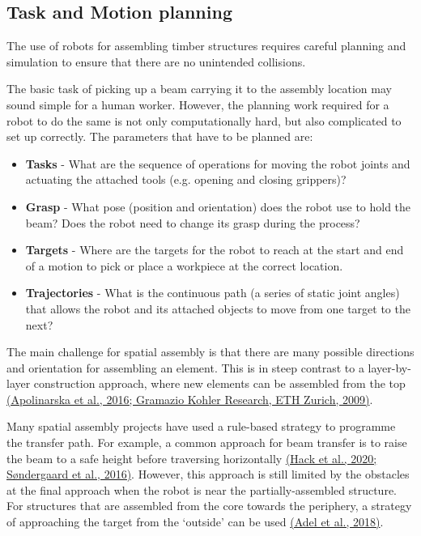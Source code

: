 \documentclass[11pt]{book}
\begin{document}
\subsection{Task and Motion planning}

The use of robots for assembling timber structures requires careful planning and simulation to ensure that there are no unintended collisions. 

The basic task of picking up a beam carrying it to the assembly location may sound simple for a human worker. However, the planning work required for a robot to do the same is not only computationally hard, but also complicated to set up correctly. The parameters that have to be planned are:

\begin{itemize}
	\item \textbf{Tasks} - What are the sequence of operations for moving the robot joints and actuating the attached tools (e.g. opening and closing grippers)?

	\item \textbf{Grasp }- What pose (position and orientation) does the robot use to hold the beam? Does the robot need to change its grasp during the process?

	\item \textbf{Targets }- Where are the targets for the robot to reach at the start and end of a motion to pick or place a workpiece at the correct location.

	\item \textbf{Trajectories }- What is the continuous path (a series of static joint angles) that allows the robot and its attached objects to move from one target to the next?

\end{itemize}
The main challenge for spatial assembly is that there are many possible directions and orientation for assembling an element. This is in steep contrast to a layer-by-layer construction approach, where new elements can be assembled from the top \href{https://www.zotero.org/google-docs/?vZK1dq}{(Apolinarska et al., 2016; Gramazio Kohler Research, ETH Zurich, 2009)}. 

Many spatial assembly projects have used a rule-based strategy to programme the transfer path. For example, a common approach for beam transfer is to raise the beam to a safe height before traversing horizontally \href{https://www.zotero.org/google-docs/?SFqNJ2}{(Hack et al., 2020; Søndergaard et al., 2016)}. However, this approach is still limited by the obstacles at the final approach when the robot is near the partially-assembled structure. For structures that are assembled from the core towards the periphery, a strategy of approaching the target from the ‘outside’ can be used \href{https://www.zotero.org/google-docs/?aftLlm}{(Adel et al., 2018)}. 
\end{document}

